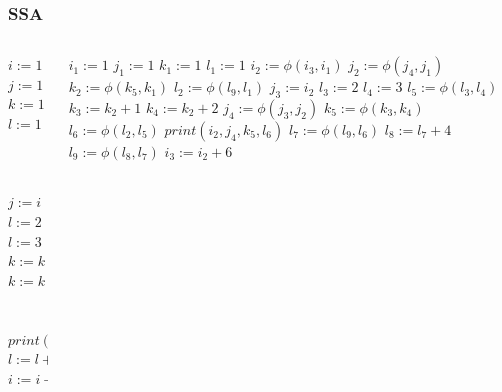 \documentclass{beamer}
\begin{document}
\begin{frame}[shrink=50]
    \frametitle{SSA}
	\begin{columns}
	\begin{column}{0.50\textwidth}
    	\begin{algorithmic}
			\State $i := 1$
			\State $j := 1$
			\State $k := 1$
			\State $l := 1$
			\Repeat
				\\
				\\
				\\
				\\
					\State $j := i$
						\State $l := 2$
					\Else
						\State $l := 3$
					\EndIf
					\\
					\State $k := k + 1$
				\Else
					\State $k := k + 2$
				\EndIf
				\\
				\\
				\\
				\State $print(i, j, k, l)$
				\Repeat
				\\
					 \State $l := l + 4$
					\EndIf
					\\
				\State $i := i + 6$
		\end{algorithmic}
	\end{column}
	
	\begin{column}{0.45\textwidth}
		\begin{algorithmic}
			\State $i_1 := 1$
			\State $j_1 := 1$
			\State $k_1 := 1$
			\State $l_1 := 1$
			\Repeat
				\State $i_2 := \phi(i_3, i_1)$
				\State $j_2 := \phi(j_4, j_1)$
				\State $k_2 := \phi(k_5, k_1)$
				\State $l_2 := \phi(l_9, l_1)$
				\If {P}
					\State $j_3 := i_2$
					\If {Q}
						\State $l_3 := 2$
					\Else
						\State $l_4 := 3$
					\EndIf
					\State $l_5 := \phi(l_3, l_4)$
					\State $k_3 := k_2 + 1$
				\Else
					\State $k_4 := k_2 + 2$
				\EndIf
				\State $j_4 := \phi(j_3, j_2)$
				\State $k_5 := \phi(k_3, k_4)$
				\State $l_6 := \phi(l_2, l_5)$
				\State $print(i_2, j_4, k_5, l_6)$
				\Repeat
					\State $l_7 := \phi(l_9, l_6)$
					 \State $l_8 := l_7 + 4$
					\EndIf
					\State $l_9 := \phi(l_8, l_7)$
				\Until {S}
				\State $i_3 := i_2 + 6$
			\Until {T}
		\end{algorithmic}
	\end{column}
	\end{columns}
  \end{frame}
\end{document}
